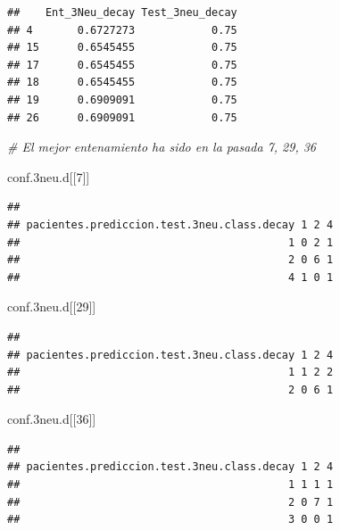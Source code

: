 \documentclass[]{article}
\newenvironment{Shaded}{\begin{snugshade}}{\end{snugshade}}
\newcommand{\CommentTok}[1]{\textcolor[rgb]{0.56,0.35,0.01}{\textit{#1}}}
\newcommand{\DecValTok}[1]{\textcolor[rgb]{0.00,0.00,0.81}{#1}}
\newcommand{\FloatTok}[1]{\textcolor[rgb]{0.00,0.00,0.81}{#1}}
\newcommand{\NormalTok}[1]{#1}
\begin{document}
\begin{verbatim}
##    Ent_3Neu_decay Test_3neu_decay
## 4       0.6727273            0.75
## 15      0.6545455            0.75
## 17      0.6545455            0.75
## 18      0.6545455            0.75
## 19      0.6909091            0.75
## 26      0.6909091            0.75
\end{verbatim}

\begin{Shaded}
\begin{Highlighting}[]
\CommentTok{# El mejor entenamiento ha sido en la pasada 7, 29, 36}

\NormalTok{conf}\FloatTok{.3}\NormalTok{neu.d[[}\DecValTok{7}\NormalTok{]]}
\end{Highlighting}
\end{Shaded}

\begin{verbatim}
##                                           
## pacientes.prediccion.test.3neu.class.decay 1 2 4
##                                          1 0 2 1
##                                          2 0 6 1
##                                          4 1 0 1
\end{verbatim}

\begin{Shaded}
\begin{Highlighting}[]
\NormalTok{conf}\FloatTok{.3}\NormalTok{neu.d[[}\DecValTok{29}\NormalTok{]]}
\end{Highlighting}
\end{Shaded}

\begin{verbatim}
##                                           
## pacientes.prediccion.test.3neu.class.decay 1 2 4
##                                          1 1 2 2
##                                          2 0 6 1
\end{verbatim}

\begin{Shaded}
\begin{Highlighting}[]
\NormalTok{conf}\FloatTok{.3}\NormalTok{neu.d[[}\DecValTok{36}\NormalTok{]]}
\end{Highlighting}
\end{Shaded}

\begin{verbatim}
##                                           
## pacientes.prediccion.test.3neu.class.decay 1 2 4
##                                          1 1 1 1
##                                          2 0 7 1
##                                          3 0 0 1
\end{verbatim}
\end{document}
